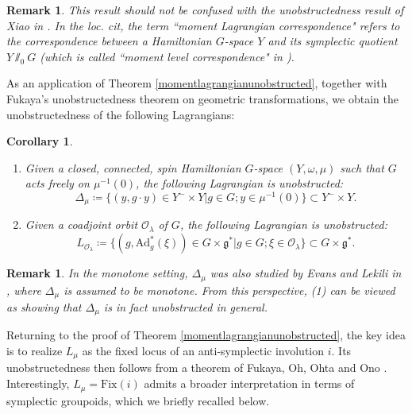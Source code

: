 \documentclass{amsart}
\newtheorem{corollary}[theorem]{Corollary}
\newtheorem{remark}[theorem]{Remark}
\numberwithin{equation}{section}
\newcommand{\Ad}{\mathrm{Ad}}
\begin{document}
\begin{remark}
    This result should not be confused with the unobstructedness result of Xiao in \cite{xiao2}. In the loc. cit, the term ``moment Lagrangian correspondence" refers to the correspondence between a Hamiltonian $G$-space $Y$ and its symplectic quotient $Y \sslash_0 G$ (which is called ``moment level correspondence" in \cite{lauleungli}).
\end{remark}

As an application of Theorem \ref{momentlagrangianunobstructed}, together with Fukaya's unobstructedness theorem on geometric transformations, we obtain the unobstructedness of the following Lagrangians:

\begin{corollary}\label{cor: exunoblag}
    \begin{enumerate}
        \item Given a closed, connected, spin Hamiltonian $G$-space $(Y, \omega, \mu)$ such that $G$ acts freely on $\mu^{-1}(0)$, the following Lagrangian is unobstructed: $$\Delta_\mu \coloneqq  \{(y, g\cdot y) \in Y^- \times Y | g\in G; y\in \mu^{-1}(0)\} \subset Y^- \times Y.$$
        \item Given a coadjoint orbit $\mathcal{O}_\lambda$ of $G$, the following Lagrangian is unobstructed: $$L_{\mathcal{O}_\lambda} \coloneqq  \{(g, \Ad^*_g(\xi)) \in G \times \mathfrak{g}^* | g\in G; \xi\in \mathcal{O}_\lambda\}\subset G \times \mathfrak{g}^*.$$
    \end{enumerate}
\end{corollary}

\begin{remark}
In the monotone setting, $\Delta_\mu$ was also studied by Evans and Lekili in \cite[Section 6.2]{EL}, where $\Delta_\mu$ is assumed to be monotone. 
From this perspective, (1) can be viewed as showing that $\Delta_\mu$ is in fact unobstructed in general. 
\end{remark}

Returning to the proof of Theorem \ref{momentlagrangianunobstructed}, the key idea is to realize $L_\mu$ as the fixed locus of an anti-symplectic involution $i$. Its unobstructedness then follows from a theorem of Fukaya, Oh, Ohta and Ono \cite[Corollary 1.7]{FOOOinvol}. 
Interestingly, $L_\mu = \mathrm{Fix}(i)$ admits a broader interpretation in terms of symplectic groupoids, which we briefly recalled below.
\end{document}
